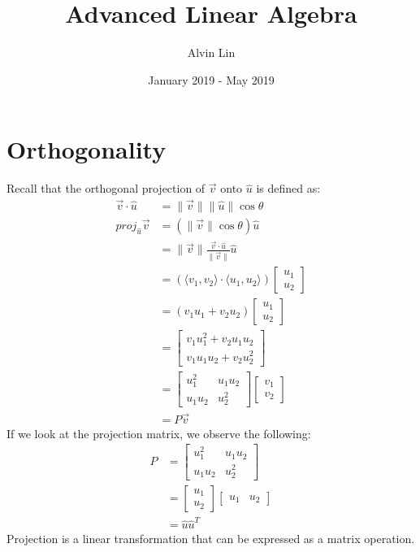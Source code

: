 \documentclass{math}
\title{Advanced Linear Algebra}
\author{Alvin Lin}
\date{January 2019 - May 2019}
\begin{document}
\maketitle

\section*{Orthogonality}
Recall that the orthogonal projection of \( \vec{v} \) onto \( \hat{u} \) is
defined as:
\begin{align*}
  \vec{v}\cdot\hat{u} &= \|\vec{v}\|\|\hat{u}\|\cos\theta \\
  proj_{\hat{u}}\vec{v} &= (\|\vec{v}\|\cos\theta)\hat{u} \\
  &= \|\vec{v}\|\frac{\vec{v}\cdot\hat{u}}{\|\vec{v}\|}\hat{u} \\
  &= (\langle v_1,v_2\rangle\cdot\langle u_1,u_2\rangle)\begin{bmatrix}
    u_1 \\ u_2
  \end{bmatrix} \\
  &= (v_1u_1+v_2u_2)\begin{bmatrix}
    u_1 \\ u_2
  \end{bmatrix} \\
  &= \begin{bmatrix}
    v_1u_1^2+v_2u_1u_2 \\
    v_1u_1u_2+v_2u_2^2
  \end{bmatrix} \\
  &= \begin{bmatrix}
    u_1^2 & u_1u_2 \\
    u_1u_2 & u_2^2
  \end{bmatrix}\begin{bmatrix}
    v_1 \\ v_2
  \end{bmatrix} \\
  &= P\vec{v}
\end{align*}
If we look at the projection matrix, we observe the following:
\begin{align*}
  P &= \begin{bmatrix}
    u_1^2 & u_1u_2 \\
    u_1u_2 & u_2^2
  \end{bmatrix} \\
  &= \begin{bmatrix}u_1 \\ u_2\end{bmatrix}
    \begin{bmatrix}u_1 & u_2\end{bmatrix} \\
  &= \hat{u}\hat{u}^T
\end{align*}
Projection is a linear transformation that can be expressed as a matrix
operation.
\end{document}
